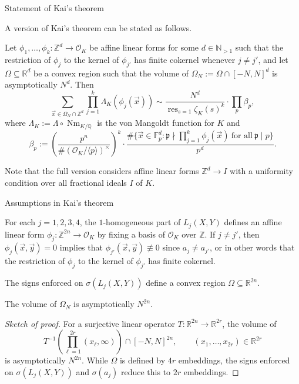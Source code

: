 \documentclass[10pt]{beamer}
\begin{document}
\begin{frame}[t]{Statement of Kai's theorem}

A version of Kai's theorem can be stated as follows.

\begin{theorem}[A.8]
Let $ \phi_1, \dots, \phi_k : \mathbb{Z}^d \to \mathcal{O}_K $ be affine linear forms for some $ d \in \mathbb{N}_{> 1} $ such that the restriction of $ \phi_j $ to the kernel of $ \phi_{j'} $ has finite cokernel whenever $ j \ne j' $, and let $ \Omega \subseteq \mathbb{R}^d $ be a convex region such that the volume of $ \Omega_N := \Omega \cap [-N, N]^d $ is asymptotically $ N^d $. Then
$$ \sum_{\vec{x} \in \Omega_N \cap \mathbb{Z}^d} \prod_{j = 1}^k \Lambda_K(\phi_j(\vec{x})) \sim \dfrac{N^d}{\operatorname{res}_{s = 1} \zeta_K(s)^k} \cdot \prod_p \beta_p, $$
where $ \Lambda_K := \Lambda \circ \operatorname{Nm}_{K / \mathbb{Q}} $ is the von Mangoldt function for $ K $ and
$$ \beta_p := \left(\dfrac{p^n}{\#(\mathcal{O}_K / \langle p\rangle)^\times}\right)^k \cdot \dfrac{\#\{\vec{x} \in \mathbb{F}_p^d : \mathfrak{p} \nmid \prod_{j = 1}^k \phi_j(\vec{x}) \ \text{for all} \ \mathfrak{p} \mid p\}}{p^d}. $$
\end{theorem}

Note that the full version considers affine linear forms $ \mathbb{Z}^d \to I $ with a uniformity condition over all fractional ideals $ I $ of $ K $.

\end{frame}

\begin{frame}[t]{Assumptions in Kai's theorem}

For each $ j = 1, 2, 3, 4 $, the $ 1 $-homogeneous part of $ L_j(X, Y) $ defines an affine linear form $ \phi_j : \mathbb{Z}^{2n} \to \mathcal{O}_K $ by fixing a basis of $ \mathcal{O}_K $ over $ \mathbb{Z} $. If $ j \ne j' $, then $ \phi_j(\vec{x}, \vec{y}) = 0 $ implies that $ \phi_{j'}(\vec{x}, \vec{y}) \not\equiv 0 $ since $ a_j \ne a_{j'} $, or in other words that the restriction of $ \phi_j $ to the kernel of $ \phi_{j'} $ has finite cokernel.

\vspace{0.5cm} The signs enforced on $ \sigma(L_j(X, Y)) $ define a convex region $ \Omega \subseteq \mathbb{R}^{2n} $.

\begin{lemma}[5.6, 5.7]
The volume of $ \Omega_N $ is asymptotically $ N^{2n} $.
\end{lemma}

\begin{proof}[Sketch of proof]
For a surjective linear operator $ T : \mathbb{R}^{2n} \to \mathbb{R}^{2r} $, the volume of
$$ T^{-1}\left(\prod_{\ell = 1}^{2r} (x_\ell, \infty)\right) \cap [-N, N]^{2n}, \qquad (x_1, \dots, x_{2r}) \in \mathbb{R}^{2r} $$
is asymptotically $ N^{2n} $. While $ \Omega $ is defined by $ 4r $ embeddings, the signs enforced on $ \sigma(L_j(X, Y)) $ and $ \sigma(a_j) $ reduce this to $ 2r $ embeddings.
\end{proof}

\end{frame}
\end{document}
